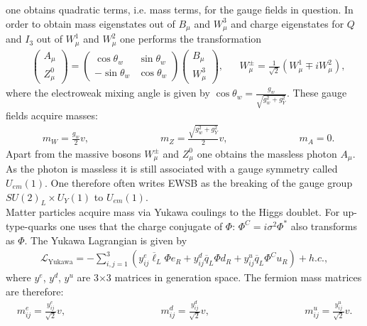 one obtains quadratic terms, i.e. mass terms, for the gauge fields in question. In order to obtain mass eigenstates out of $B_\mu$ and $W_\mu^3$ and charge eigenstates for $Q$ and $I_3$ out of $W_\mu^1$ and $W_\mu^2$ one performs the transformation
\begin{align}
&\begin{pmatrix}
A_\mu \\
Z^0_\mu
\end{pmatrix} = \begin{pmatrix}
\cos \theta_w & \sin \theta_w \\
-\sin \theta_w & \cos \theta_w
\end{pmatrix} \begin{pmatrix}
B_\mu \\
W^3_\mu
\end{pmatrix},
&& W^{\pm}_\mu = \frac{1}{\sqrt{2}}(W^1_\mu \mp i W^2_\mu),
\end{align}
where the electroweak mixing angle is given by $\cos\theta_w = \frac{g_w}{\sqrt{g_w^2 + g_Y^2}}$.
These gauge fields acquire masses:
\begin{align}
& m_W = \frac{g_w}{2} v, \hspace{3cm} m_Z = \frac{\sqrt{g_w^2+g_Y^2}}{2} v, \hspace{3cm} m_A = 0.
\end{align}
Apart from the massive bosons $W^\pm_\mu$ and $Z^0_\mu$ one obtains the massless photon $A_\mu$. As the photon is massless it is still associated with a gauge symmetry called $U_{em}(1)$. One therefore often writes EWSB as the breaking of the gauge group $SU(2)_L \times U_Y(1)$ to $U_{em}(1)$.\\
Matter particles acquire mass via Yukawa coulings to the Higgs doublet. For up-type-quarks one uses that the charge conjugate of $\Phi$: $\Phi^C = i \sigma^2 \Phi^\ast$ also transforms as $\Phi$. The Yukawa Lagrangian is given by
\begin{align}
\mathcal{L}_{\mathrm{Yukawa}} = -\sum_{i,j=1}^3 \left( y_{ij}^e \overline{\ell}_L \Phi e_R  + y_{ij}^d \overline{q}_L \Phi d_R + y_{ij}^u \overline{q}_L \Phi^C u_R\right) + h.c., \label{eq:LYukawa}
\end{align}
where $y^e$, $y^d$, $y^u$ are 3$\times$3 matrices in generation space. The fermion mass matrices are therefore:
\begin{align}
m^e_{ij} = \frac{y^e_{ij}}{\sqrt{2}} v,  \hspace{4cm} m^d_{ij} = \frac{y^d_{ij}}{\sqrt{2}} v, \hspace{4cm} m^u_{ij} = \frac{y^u_{ij}}{\sqrt{2}} v.
\end{align}
